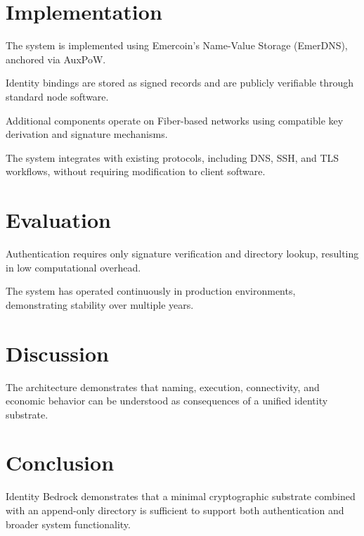\documentclass[11pt,a4paper]{article}
\begin{document}
\section{Implementation}

The system is implemented using Emercoin's Name-Value Storage (EmerDNS), anchored via AuxPoW.

Identity bindings are stored as signed records and are publicly verifiable through standard node software.

Additional components operate on Fiber-based networks using compatible key derivation and signature mechanisms.

The system integrates with existing protocols, including DNS, SSH, and TLS workflows, without requiring modification to client software.

\section{Evaluation}

Authentication requires only signature verification and directory lookup, resulting in low computational overhead.

The system has operated continuously in production environments, demonstrating stability over multiple years.

\section{Discussion}

The architecture demonstrates that naming, execution, connectivity, and economic behavior can be understood as consequences of a unified identity substrate.

\section{Conclusion}

Identity Bedrock demonstrates that a minimal cryptographic substrate combined with an append-only directory is sufficient to support both authentication and broader system functionality.
\end{document}
